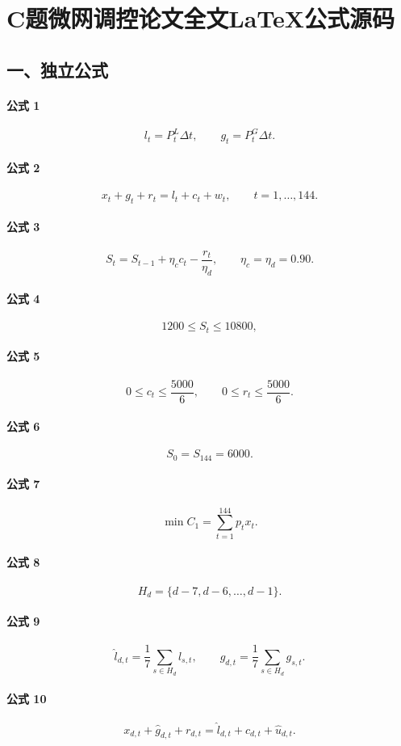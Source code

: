 \documentclass[12pt]{article}
\begin{document}
\section*{C题微网调控论文全文LaTeX公式源码}
\subsection*{一、独立公式}
\paragraph{公式 1}
\[
l_t=P^L_t\Delta t,\qquad g_t=P^G_t\Delta t.
\]
\paragraph{公式 2}
\[
x_t+g_t+r_t=l_t+c_t+w_t,\qquad t=1,\ldots,144.
\]
\paragraph{公式 3}
\[
S_t=S_{t-1}+\eta_c c_t-\frac{r_t}{\eta_d},\qquad \eta_c=\eta_d=0.90.
\]
\paragraph{公式 4}
\[
1200\le S_t\le10800,
\]
\paragraph{公式 5}
\[
0\le c_t\le \frac{5000}{6},\qquad 0\le r_t\le\frac{5000}{6}.
\]
\paragraph{公式 6}
\[
S_0=S_{144}=6000.
\]
\paragraph{公式 7}
\[
\min C_1=\sum_{t=1}^{144}p_t x_t.
\]
\paragraph{公式 8}
\[
H_d=\{d-7,d-6,\ldots,d-1\}.
\]
\paragraph{公式 9}
\[
\hat l_{d,t}=\frac{1}{7}\sum_{s\in H_d}l_{s,t},\qquad
\hat g_{d,t}=\frac{1}{7}\sum_{s\in H_d}g_{s,t}.
\]
\paragraph{公式 10}
\[
x_{d,t}+\hat g_{d,t}+r_{d,t}=\hat l_{d,t}+c_{d,t}+\hat u_{d,t}.
\]
\end{document}
